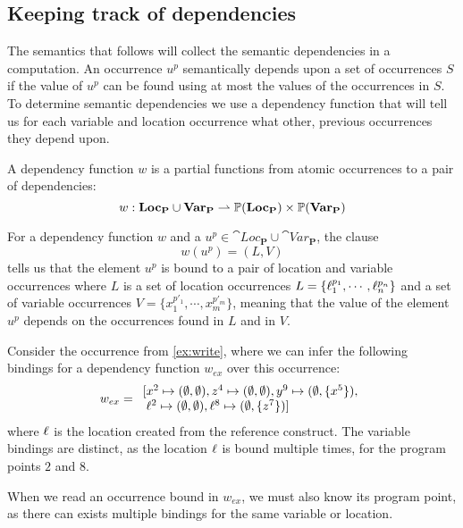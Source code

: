 \documentclass{eptcs}
\begin{document}
\subsection{Keeping track of dependencies}\label{sec:DepFunc}

The semantics that follows will collect the semantic dependencies in a
computation. An occurrence $u^p$ semantically depends upon a set of
occurrences $S$ if the value of $u^p$ can be found using at most the
values of the occurrences in $S$. To determine semantic dependencies
we use a dependency function that will tell us for each variable and
location occurrence what other, previous occurrences they depend upon.

\begin{definition}\label{def:DepFunc}
  A dependency function $w$ is a partial functions from atomic
  occurrences to a pair of dependencies:
\[
  w: \textbf{Loc}_{\mathbf{P}}\cup\textbf{Var}_{\mathbf{P}}\rightharpoonup\mathbb{P}(\textbf{Loc}_{\mathbf{P}})\times\mathbb{P}(\textbf{Var}_{\mathbf{P}}) \] 
\end{definition}
For a dependency function $w$ and a
$u^p\in\cat{Loc}_{\mathbf{P}}\cup\cat{Var}_{\mathbf{P}}$, the clause
%
\[ w (u^p)=(L,V) \]
%
tells us that the element $u^p$ is bound to a pair of location and
variable occurrences where $L$ is a set of location occurrences
$L=\{\ell_1^{p_1},\cdots,\ell_n^{p_n}\}$ and a set of variable
occurrences $V =\{x_1^{p'_1},\cdots,x_m^{p'_m}\}$, meaning that the
value of the element $u^p$ depends on the occurrences found in $L$ and
in $V$.

\begin{example}\label{ex:dep}
	Consider the occurrence from \cref{ex:write}, where we can
        infer the following bindings for a dependency function
        $w_{ex}$ over this occurrence: 
	\[
          w_{ex}= \begin{array}{l}
                    [x^2\mapsto(\emptyset,\emptyset),z^4\mapsto(\emptyset,\emptyset),y^9\mapsto(\emptyset,\{x^5\}),
                    \\ \; \ell^2\mapsto(\emptyset,\emptyset),\ell^8\mapsto(\emptyset,\{z^7\})] \end{array} \]
	where $\ell$ is the location created from the reference construct.
	The variable bindings are distinct, as the location $\ell$ is
        bound multiple times, for the program points $2$ and $8$. 

        When we read an occurrence bound in $w_{ex}$, we must also
        know its program point, as there can exists multiple bindings
        for the same variable or location.
\end{example}
\end{document}
